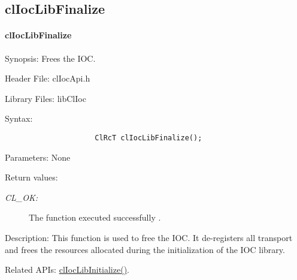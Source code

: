 \begin{flushleft}
\newpage


\subsection{clIocLibFinalize}
\hypertarget{pageIOC132}{}\paragraph{cl\-Ioc\-Lib\-Finalize}\label{pageIOC132}
\begin{Desc}
\item[Synopsis: ]Frees the IOC.\end{Desc}
\begin{Desc}
\item[Header File:]clIocApi.h\end{Desc}
\begin{Desc}
\item[Library Files:]libClIoc\end{Desc}
\begin{Desc}
\item[Syntax: ]

\footnotesize\begin{verbatim}                     ClRcT clIocLibFinalize(); 
\end{verbatim}
\normalsize
\end{Desc}
\begin{Desc}
\item[Parameters: ]None\end{Desc}
\begin{Desc}
\item[Return values:]
\begin{description}
\item[{\em CL\_\-OK:}]The function executed successfully .\end{description}
\end{Desc}
\begin{Desc}
\item[Description: ]This function is used to free the IOC. It de-registers all transport and frees the resources allocated during the 
initialization of the IOC library.
\end{Desc}
\begin{Desc}
\item[Related APIs:]\hyperlink{pageIOC131}{clIocLibInitialize()}. \end{Desc}

\newpage



\end{flushleft}
